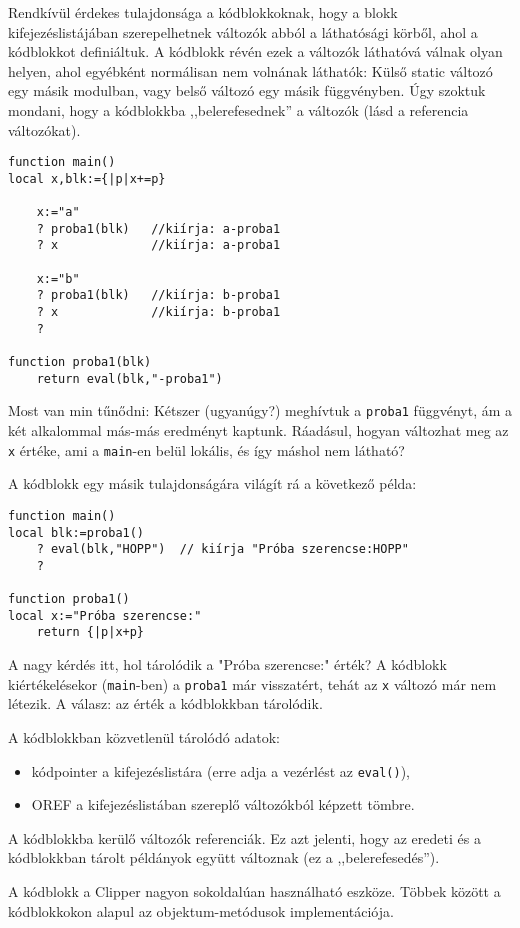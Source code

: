Rendkívül érdekes tulajdonsága a kódblokkoknak, hogy a blokk kifejezéslistájában
szerepelhetnek változók abból a láthatósági körből, ahol a kódblokkot
definiáltuk. A kódblokk révén ezek a változók láthatóvá válnak olyan helyen,
ahol egyébként normálisan nem volnának láthatók: Külső static változó egy másik 
modulban, vagy belső változó egy másik függvényben. Úgy szoktuk mondani,
hogy a kódblokkba ,,belerefesednek'' a változók (lásd a referencia változókat).

\begin{verbatim}
function main()
local x,blk:={|p|x+=p}

    x:="a"
    ? proba1(blk)   //kiírja: a-proba1
    ? x             //kiírja: a-proba1

    x:="b"
    ? proba1(blk)   //kiírja: b-proba1
    ? x             //kiírja: b-proba1
    ?
    
function proba1(blk)    
    return eval(blk,"-proba1")
\end{verbatim}
Most van min tűnődni:
Kétszer (ugyanúgy?) meghívtuk a \verb!proba1! függvényt,
ám a két alkalommal más-más eredményt kaptunk. 
Ráadásul, hogyan változhat meg az \verb!x! értéke,
ami a \verb!main!-en belül lokális, és így máshol nem látható?


A kódblokk egy másik tulajdonságára világít rá a következő példa:
\begin{verbatim}
function main()
local blk:=proba1()
    ? eval(blk,"HOPP")  // kiírja "Próba szerencse:HOPP"
    ?

function proba1()    
local x:="Próba szerencse:"
    return {|p|x+p}
\end{verbatim}
A nagy kérdés itt, hol tárolódik a "Próba szerencse:" érték?
A kódblokk kiértékelésekor (\verb!main!-ben) a \verb!proba1! már visszatért,
tehát az \verb!x! változó már nem létezik. A válasz: az érték a kódblokkban tárolódik.


A kódblokkban közvetlenül tárolódó adatok:
\begin{itemize}
 \item kódpointer a kifejezéslistára (erre adja a vezérlést az \verb!eval()!),
 \item OREF a kifejezéslistában szereplő változókból képzett tömbre.
\end{itemize}
A kódblokkba kerülő változók referenciák. Ez azt jelenti, hogy az eredeti
és a kódblokkban tárolt példányok együtt változnak (ez a ,,belerefesedés'').

A kódblokk a Clipper nagyon sokoldalúan használható eszköze.
Többek között a kódblokkokon alapul az objektum-metódusok implementációja.




